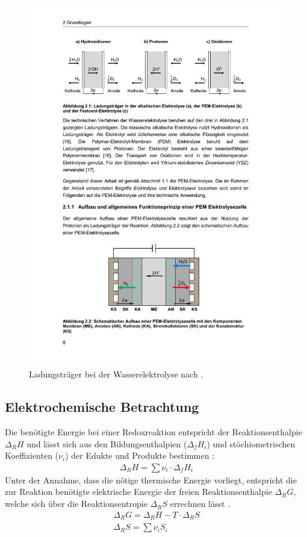 \begin{figure}[h]
	\centering
		\includegraphics[scale=1]{Figures/LadungstraegerBeiDerWasserelektrolyse}
		\caption{Ladungsträger bei der 
		Wasserelektrolyse nach \citet{tjarks_pem-elektrolyse-systeme_2017}.}
\label{fig:LadungstraegerBeiDerWasserelektrolyse}	
\end{figure}

\subsection{Elektrochemische Betrachtung}
\label{subsec:Elektrochemische Betrachtung}
Die benötigte Energie bei einer Redoxreaktion entspricht der Reaktionsenthalpie $\Delta_R H$ und lässt sich aus den Bildungsenthalpien ($\Delta_f H_i$) und stöchiometrischen Koeffizienten ($\nu_i$) der Edukte und Produkte bestimmen \citep{falcao_review_2020,brauns_alkaline_2020}:
\begin{align}
 	\Delta_R H = \sum{\nu_i \cdot \Delta_f H_i}
\end{align}
Unter der Annahme, dass die nötige thermische Energie vorliegt, entspricht die zur Reaktion benötigte elektrische Energie  der freien Reaktionsenthalpie $\Delta_R G$, welche sich über die Reaktionsentropie $\Delta_R S$ errechnen lässt \citep{falcao_review_2020,brauns_alkaline_2020}.
\begin{align}
	\Delta_R G = \Delta_R H - T \cdot \Delta_R S \\
 	\Delta _R S = \sum{\nu_i S_i}
\end{align}

